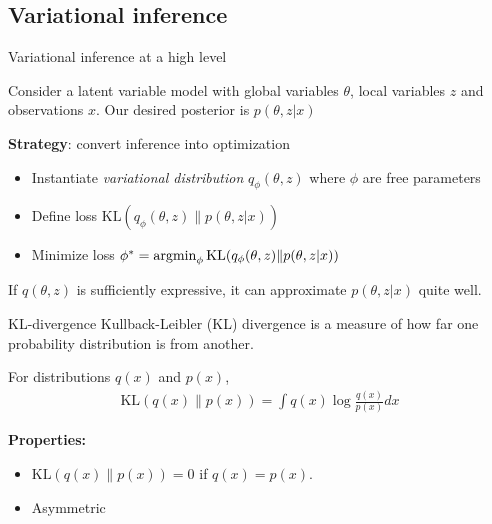 \documentclass[10pt, compress]{beamer}
\begin{document}
\subsection{Variational inference}
\begin{frame}{Variational inference at a high level}

	\pause
		Consider a latent variable model with global variables
		$\theta$, local variables $z$ and observations $x$. Our desired
		posterior is $p(\theta, z | x)$

		\pause
		\textbf{Strategy}: convert inference into optimization
		\begin{itemize}
				\pause
			\item Instantiate \emph{variational distribution} $q_\phi(\theta, z)$
				where $\phi$ are free parameters
				\pause
			\item Define loss $\textrm{KL}(q_\phi(\theta, z)\|p(\theta, z | x))$
				\pause
			\item Minimize loss $\phi^* = \operatorname*{argmin}_\phi \textrm{KL}(q_\phi(\theta, z)\|p(\theta, z | x))$
		\end{itemize}
		\pause
		If $q(\theta, z)$ is sufficiently expressive,
		it can approximate $p(\theta, z | x)$ quite well.
\end{frame}

\begin{frame}{KL-divergence}
	Kullback-Leibler (KL) divergence
	is a measure of how far one probability distribution
	is from another.

	\pause
	For distributions $q(x)$ and $p(x)$,
	\begin{align*}
		\textrm{KL}(q(x)\|p(x)) = \int q(x)\log \frac{q(x)}{p(x)}dx
	\end{align*}

	\pause
	\textbf{Properties:}
	\begin{itemize}
		\item $\textrm{KL}(q(x)\|p(x)) = 0$ if $q(x) = p(x)$.
		\item Asymmetric
	\end{itemize}

\end{frame}
\end{document}
